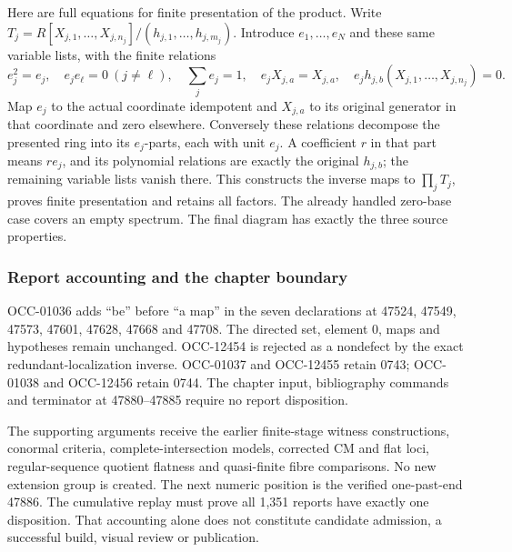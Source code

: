 Here are full equations for finite presentation of the product. Write \(T_j=R[X_{j,1},\ldots,X_{j,n_j}]/(h_{j,1},\ldots,h_{j,m_j})\). Introduce \(e_1,\ldots,e_N\) and these same variable lists, with the finite relations \[
e_j^2=e_j,\quad e_je_\ell=0\ (j\ne\ell),\quad
\sum_j e_j=1,\quad e_jX_{j,a}=X_{j,a},\quad
e_jh_{j,b}(X_{j,1},\ldots,X_{j,n_j})=0.
\] Map \(e_j\) to the actual coordinate idempotent and \(X_{j,a}\) to its original generator in that coordinate and zero elsewhere. Conversely these relations decompose the presented ring into its \(e_j\)-parts, each with unit \(e_j\). A coefficient \(r\) in that part means \(re_j\), and its polynomial relations are exactly the original \(h_{j,b}\); the remaining variable lists vanish there. This constructs the inverse maps to \(\prod_jT_j\), proves finite presentation and retains all factors. The already handled zero-base case covers an empty spectrum. The final diagram has exactly the three source properties.

\subsubsection{Report accounting and the chapter boundary}\label{report-accounting-and-the-chapter-boundary}

OCC-01036 adds ``be'' before ``a map'' in the seven declarations at 47524, 47549, 47573, 47601, 47628, 47668 and 47708. The directed set, element \(0\), maps and hypotheses remain unchanged. OCC-12454 is rejected as a nondefect by the exact redundant-localization inverse. OCC-01037 and OCC-12455 retain 0743; OCC-01038 and OCC-12456 retain 0744. The chapter input, bibliography commands and terminator at 47880--47885 require no report disposition.

The supporting arguments receive the earlier finite-stage witness constructions, conormal criteria, complete-intersection models, corrected CM and flat loci, regular-sequence quotient flatness and quasi-finite fibre comparisons. No new extension group is created. The next numeric position is the verified one-past-end 47886. The cumulative replay must prove all 1,351 reports have exactly one disposition. That accounting alone does not constitute candidate admission, a successful build, visual review or publication.
